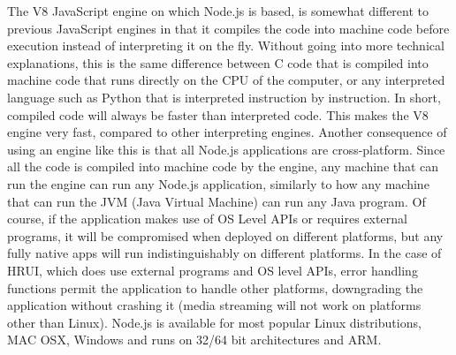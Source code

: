 The V8 JavaScript engine on which Node.js is based, is somewhat different to previous JavaScript engines in that it compiles
the code into machine code before execution instead of interpreting it on the fly. Without going into more technical
explanations, this is the same difference between C code that is compiled into machine code that runs directly on the CPU of
the computer, or any interpreted language such as Python that is interpreted instruction by instruction. In short, compiled
code will always be faster than interpreted code. This makes the V8 engine very fast, compared to other interpreting engines.
Another consequence of using an engine like this is that all Node.js applications are cross-platform. Since all the code is
compiled into machine code by the engine, any machine that can run the engine can run any Node.js application, similarly to
how any machine that can run the JVM (Java Virtual Machine) can run any Java program. Of course, if the application makes use
of OS Level APIs or requires external programs, it will be compromised when deployed on different platforms, but any fully
native apps will run indistinguishably on different platforms. In the case of HRUI, which does use external programs and OS
level APIs, error handling functions permit the application to handle other platforms, downgrading the application without
crashing it (media streaming will not work on platforms other than Linux). Node.js is available for most popular Linux
distributions, MAC OSX, Windows and runs on 32/64 bit architectures and ARM.\\

